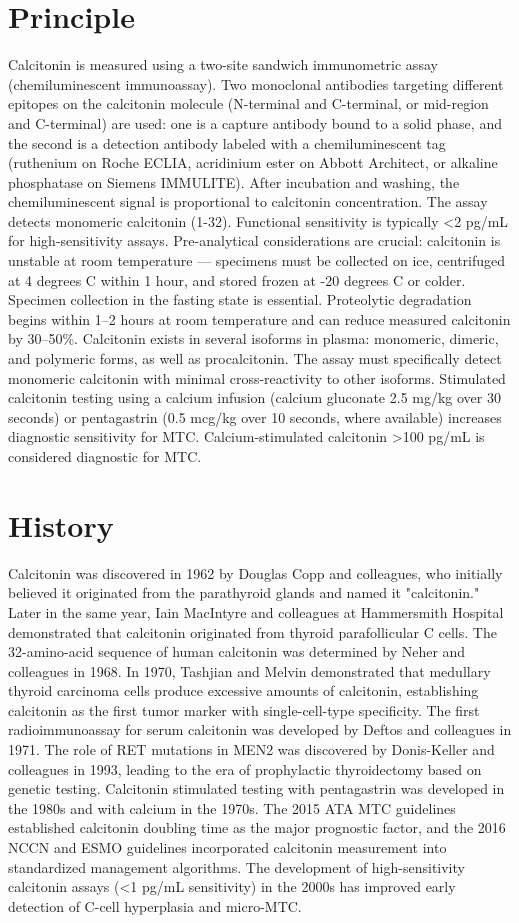 \section*{Principle}
Calcitonin is measured using a two-site sandwich immunometric assay (chemiluminescent immunoassay). Two monoclonal antibodies targeting different epitopes on the calcitonin molecule (N-terminal and C-terminal, or mid-region and C-terminal) are used: one is a capture antibody bound to a solid phase, and the second is a detection antibody labeled with a chemiluminescent tag (ruthenium on Roche ECLIA, acridinium ester on Abbott Architect, or alkaline phosphatase on Siemens IMMULITE). After incubation and washing, the chemiluminescent signal is proportional to calcitonin concentration. The assay detects monomeric calcitonin (1-32). Functional sensitivity is typically <2 pg/mL for high-sensitivity assays. Pre-analytical considerations are crucial: calcitonin is unstable at room temperature --- specimens must be collected on ice, centrifuged at 4 degrees C within 1 hour, and stored frozen at -20 degrees C or colder. Specimen collection in the fasting state is essential. Proteolytic degradation begins within 1--2 hours at room temperature and can reduce measured calcitonin by 30--50\%. Calcitonin exists in several isoforms in plasma: monomeric, dimeric, and polymeric forms, as well as procalcitonin. The assay must specifically detect monomeric calcitonin with minimal cross-reactivity to other isoforms. Stimulated calcitonin testing using a calcium infusion (calcium gluconate 2.5 mg/kg over 30 seconds) or pentagastrin (0.5 mcg/kg over 10 seconds, where available) increases diagnostic sensitivity for MTC. Calcium-stimulated calcitonin >100 pg/mL is considered diagnostic for MTC.

\section*{History}
Calcitonin was discovered in 1962 by Douglas Copp and colleagues, who initially believed it originated from the parathyroid glands and named it "calcitonin." Later in the same year, Iain MacIntyre and colleagues at Hammersmith Hospital demonstrated that calcitonin originated from thyroid parafollicular C cells. The 32-amino-acid sequence of human calcitonin was determined by Neher and colleagues in 1968. In 1970, Tashjian and Melvin demonstrated that medullary thyroid carcinoma cells produce excessive amounts of calcitonin, establishing calcitonin as the first tumor marker with single-cell-type specificity. The first radioimmunoassay for serum calcitonin was developed by Deftos and colleagues in 1971. The role of RET mutations in MEN2 was discovered by Donis-Keller and colleagues in 1993, leading to the era of prophylactic thyroidectomy based on genetic testing. Calcitonin stimulated testing with pentagastrin was developed in the 1980s and with calcium in the 1970s. The 2015 ATA MTC guidelines established calcitonin doubling time as the major prognostic factor, and the 2016 NCCN and ESMO guidelines incorporated calcitonin measurement into standardized management algorithms. The development of high-sensitivity calcitonin assays (<1 pg/mL sensitivity) in the 2000s has improved early detection of C-cell hyperplasia and micro-MTC.

